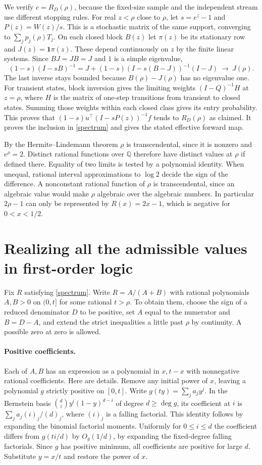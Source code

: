 \documentclass[11pt]{article}
\newcommand{\Q}{\mathbb Q}
\newcommand{\one}{\mathbf 1}
\begin{document}
We verify $c=R_D(\rho)$, because the fixed-size sample and the independent stream use different stopping rules. For real $z<\rho$ close to $\rho$, let $s=e^z-1$ and $P(z)=W(z)/s$. This is a stochastic matrix of the same support, converging to $\sum_j p_j(\rho)T_j$. On each closed block $B(z)$ let $\pi(z)$ be its stationary row and $J(z)=\one\pi(z)$. These depend continuously on $z$ by the finite linear systems. Since $B J=J B=J$ and $1$ is a simple eigenvalue,
\[
 (1-s)(I-sB)^{-1}
    =J+(1-s)(I-s(B-J))^{-1}(I-J)\ \longrightarrow\ J(\rho).
\]
The last inverse stays bounded because $B(\rho)-J(\rho)$ has no eigenvalue one. For transient states, block inversion gives the limiting weights $(I-Q)^{-1}H$ at $z=\rho$, where $H$ is the matrix of one-step transitions from transient to closed states. Summing those weights within each closed class gives its entry probability. This proves that $(1-s)u^\top(I-sP(z))^{-1}f$ tends to $R_D(\rho)$ as claimed. It proves the inclusion in \eqref{spectrum} and gives the stated effective forward map.

By the Hermite--Lindemann theorem $\rho$ is transcendental, since it is nonzero and $e^\rho=2$. Distinct rational functions over $\Q$ therefore have distinct values at $\rho$ if defined there. Equality of two limits is tested by a polynomial identity. When unequal, rational interval approximations to $\log 2$ decide the sign of the difference. A nonconstant rational function of $\rho$ is transcendental, since an algebraic value would make $\rho$ algebraic over the algebraic numbers. In particular $2\rho-1$ can only be represented by $R(x)=2x-1$, which is negative for $0<x<1/2$.

\section*{Realizing all the admissible values in first-order logic}

Fix $R$ satisfying \eqref{spectrum}. Write $R=A/(A+B)$ with rational polynomials $A,B>0$ on $(0,t]$ for some rational $t>\rho$. To obtain them, choose the sign of a reduced denominator $D$ to be positive, set $A$ equal to the numerator and $B=D-A$, and extend the strict inequalities a little past $\rho$ by continuity. A possible zero at zero is allowed.

\paragraph{Positive coefficients.}
Each of $A,B$ has an expression as a polynomial in $x,t-x$ with nonnegative rational coefficients. Here are details. Remove any initial power of $x$, leaving a polynomial $g$ strictly positive on $[0,t]$. Write $g(ty)=\sum_j a_j y^j$. In the Bernstein basis $\binom{d}{i}y^i(1-y)^{d-i}$ of degree $d\ge\deg g$, its coefficient at $i$ is $\sum_j a_j(i)_j/(d)_j$, where $(i)_j$ is a falling factorial. This identity follows by expanding the binomial factorial moments. Uniformly for $0\le i\le d$ the coefficient differs from $g(ti/d)$ by $O_g(1/d)$, by expanding the fixed-degree falling factorials. Since $g$ has positive minimum, all coefficients are positive for large $d$. Substitute $y=x/t$ and restore the power of $x$.
\end{document}
